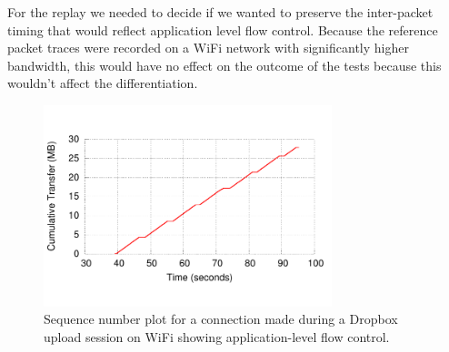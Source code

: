 \documentclass[letterpaper]{sig-alternate-10pt}
\begin{document}
For the replay we needed to decide if we wanted to preserve the inter-packet timing that would reflect application level flow control. Because the reference packet traces were recorded on a WiFi network with significantly higher bandwidth, this would have no effect on the outcome of the tests because this wouldn't affect the differentiation.

\begin{figure}[ht]
\centering
\includegraphics[width=3.3in]{figures/db_big_u}
\caption{Sequence number plot for a connection made during a Dropbox upload session on WiFi showing application-level flow control.}
\label{fig:dbu}
\end{figure}





\end{document}
